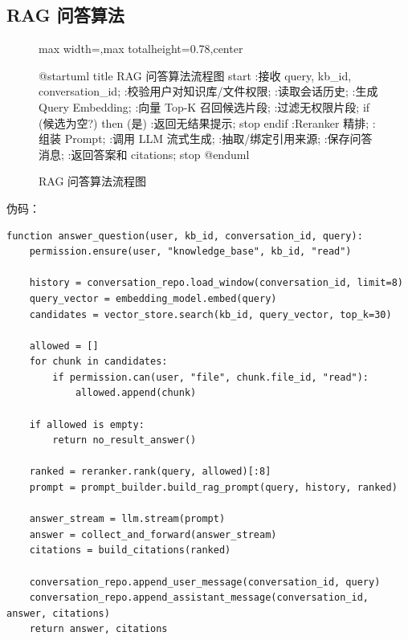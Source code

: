 \documentclass[a4paper,zihao=-4]{ctexart}
\begin{document}
\hypertarget{rag-ux95eeux7b54ux7b97ux6cd5}{%
\subsection{RAG 问答算法}\label{rag-ux95eeux7b54ux7b97ux6cd5}}

\begin{figure}[H]
\centering
\begin{adjustbox}{max width=\linewidth,max totalheight=0.78\textheight,center}
\begingroup
\renewcommand{\PlantUMLJobname}{plantuml-diagrams/req-uml-08}
\begin{plantuml}
@startuml
title RAG 问答算法流程图
start
:接收 query, kb_id, conversation_id;
:校验用户对知识库/文件权限;
:读取会话历史;
:生成 Query Embedding;
:向量 Top-K 召回候选片段;
:过滤无权限片段;
if (候选为空?) then (是)
  :返回无结果提示;
  stop
endif
:Reranker 精排;
:组装 Prompt;
:调用 LLM 流式生成;
:抽取/绑定引用来源;
:保存问答消息;
:返回答案和 citations;
stop
@enduml
\end{plantuml}
\endgroup
\end{adjustbox}
\caption{RAG 问答算法流程图}
\end{figure}

伪码：

\begin{lstlisting}
function answer_question(user, kb_id, conversation_id, query):
    permission.ensure(user, "knowledge_base", kb_id, "read")

    history = conversation_repo.load_window(conversation_id, limit=8)
    query_vector = embedding_model.embed(query)
    candidates = vector_store.search(kb_id, query_vector, top_k=30)

    allowed = []
    for chunk in candidates:
        if permission.can(user, "file", chunk.file_id, "read"):
            allowed.append(chunk)

    if allowed is empty:
        return no_result_answer()

    ranked = reranker.rank(query, allowed)[:8]
    prompt = prompt_builder.build_rag_prompt(query, history, ranked)

    answer_stream = llm.stream(prompt)
    answer = collect_and_forward(answer_stream)
    citations = build_citations(ranked)

    conversation_repo.append_user_message(conversation_id, query)
    conversation_repo.append_assistant_message(conversation_id, answer, citations)
    return answer, citations
\end{lstlisting}
\end{document}
